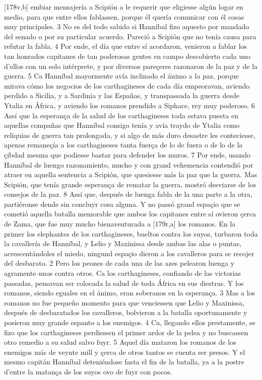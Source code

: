 \documentclass[11pt,twoside]{article}\makeatletter
\def\persName{}\def\name{}
\def\placeName{}
\begin{document}
[178v,b] embiar mensajería a Scipión a le requerir que eligiesse algún logar en medio, para que entre ellos fablassen, porque él quería comunicar con él cosas muy principales. 3 No es del todo sabido si  {\persName Hanníbal} fizo aquesto por mandado del senado o por su particular acuerdo. Pareció a Scipión que no tenía causa para refutar la fabla. 4 Por ende, el día que entre sí acordaron, venieron a fablar los tan honrados capitanes de tan poderosas gentes en campo descobierto cada uno d’ellos con un solo intérprete, y por diversos pareçeres razonaron de la paz y de la guerra. 5 Ca  {\persName Hanníbal} mayormente avía inclinado el ánimo a la paz, porque mirava cómo los negocios de los  {\name carthagineses} de cada día empeoravan, aviendo perdido a  {\placeName Sicilia}, y a  {\placeName Sardinia} y las  {\placeName Españas}, y transpassada la guerra desde Ytalia en  {\placeName África}, y aviendo los romanos prendido a Siphace, rey muy poderoso. 6 Assí que la esperança de la salud de los  {\name carthagineses} toda estava puesta en aquellas compañas que  {\persName Hanníbal} consigo tenía y avía traydo de Ytalia como reliquias de guerra tan prolongada, y si algo de más duro desastre les conteciesse, apenas remaneçía a los  {\name carthagineses} tanta fuerça de lo de fuera o de lo de la çibdad mesma que podiesse bastar para defender los muros. 7 Por ende, usando  {\persName Hanníbal} de luengo razonamiento, mucho y con grand vehemencia contendió por atraer en aquella sentencia a Scipión, que quesiesse más la paz que la guerra. Mas Scipión, que tenía grande esperança de rematar la guerra, mostró desviarse de los consejos de la paz. 8 Assí que, después de luenga fabla de la una parte a la otra, partiéronse dende sin concluyr cosa alguna. Y no passó grand espaçio que se cometió aquella batalla memorable que ambos los capitanes entre sí ovieron çerca de Zama, que fue muy mucho bienaventurada a %
[179r,a] los romanos.
\pend
{} En la primer  los elephantes de los  {\name carthagineses}, bueltos contra los suyos, turbaron toda la cavallería de  {\persName Hanníbal}, y Lelio y Maxinissa desde ambas las alas o puntas, acrescentándoles el miedo, ningund espaçio dieron a los cavalleros para se recojer del desbarato. 2 Pero los peones de cada una de las azes pelearon luenga y agramente unos contra otros. Ca los  {\name carthagineses}, confiando de las victorias passadas, pensavan ser colocada la salud de toda  {\placeName África} en sus diestras. Y los romanos, siendo eguales en el ánimo, eran soberanos en la esperança. 3 Mas a los romanos no fue pequeño momento para que venciessen que Lelio y Maxinissa, después de desbaratados los cavalleros, bolvieron a la batalla oportunamente y posieron muy grande espanto a los enemigos. 4 Ca, llegando ellos prestamente, se fizo que los  {\name carthagineses} perdiessen el primer ardor de la pelea y no buscassen otro remedio a su salud salvo fuyr. 5 Aquel día mataron los romanos de los enemigos más de veynte mill y çerca de otros tantos se cuenta ser presos. Y el mesmo capitán  {\persName Hanníbal} deteniéndose fasta el fin de la batalla, ya a la postre d’entre la matança de los suyos ovo de fuyr con pocos.
\end{document}
